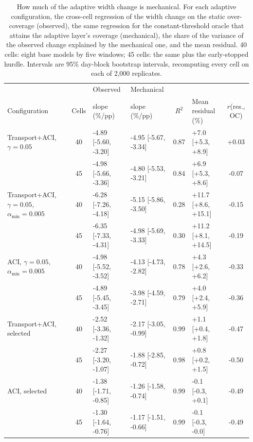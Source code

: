 \begin{table}[tp]
\centering
\footnotesize
\caption{How much of the adaptive width change is mechanical. For each adaptive configuration, the cross-cell regression of the width change on the static over-coverage (observed), the same regression for the constant-threshold oracle that attains the adaptive layer's coverage (mechanical), the share of the variance of the observed change explained by the mechanical one, and the mean residual. 40 cells: eight base models by five windows; 45 cells: the same plus the early-stopped hurdle. Intervals are 95\% day-block bootstrap intervals, recomputing every cell on each of 2{,}000 replicates.}
\label{tab:mecanico}
\setlength{\tabcolsep}{4pt}
\begin{tabular}{l c l l c l c}
\toprule
 & & Observed & Mechanical & & & \\
Configuration & Cells & slope (\%/pp) & slope (\%/pp) & $R^2$ & Mean residual (\%) & $r$(res., OC) \\
\midrule
Transport+ACI, $\gamma=0.05$ & 40 & -4.89 [-5.60, -3.20] & -4.95 [-5.67, -3.34] & 0.87 & +7.0 [+5.3, +8.9] & +0.03 \\
 & 45 & -4.98 [-5.66, -3.36] & -4.80 [-5.53, -3.21] & 0.84 & +6.9 [+5.3, +8.6] & -0.07 \\
\addlinespace[2pt]
Transport+ACI, $\gamma=0.05$, $\alpha_{\min}=0.005$ & 40 & -6.28 [-7.26, -4.18] & -5.15 [-5.86, -3.50] & 0.28 & +11.7 [+8.6, +15.1] & -0.15 \\
 & 45 & -6.35 [-7.33, -4.31] & -4.98 [-5.69, -3.33] & 0.30 & +11.2 [+8.1, +14.5] & -0.19 \\
\addlinespace[2pt]
ACI, $\gamma=0.05$, $\alpha_{\min}=0.005$ & 40 & -4.98 [-5.52, -3.52] & -4.13 [-4.73, -2.82] & 0.78 & +4.3 [+2.6, +6.2] & -0.33 \\
 & 45 & -4.89 [-5.45, -3.45] & -3.98 [-4.59, -2.71] & 0.79 & +4.0 [+2.4, +5.9] & -0.36 \\
\addlinespace[2pt]
Transport+ACI, selected & 40 & -2.52 [-3.36, -1.32] & -2.17 [-3.05, -0.99] & 0.99 & +1.1 [+0.4, +1.8] & -0.47 \\
 & 45 & -2.27 [-3.20, -1.07] & -1.88 [-2.85, -0.72] & 0.98 & +0.8 [+0.2, +1.5] & -0.50 \\
\addlinespace[2pt]
ACI, selected & 40 & -1.38 [-1.71, -0.85] & -1.26 [-1.58, -0.74] & 0.99 & -0.1 [-0.3, +0.1] & -0.49 \\
 & 45 & -1.30 [-1.64, -0.76] & -1.17 [-1.51, -0.66] & 0.99 & -0.1 [-0.3, -0.0] & -0.49 \\
\bottomrule
\end{tabular}
\end{table}
